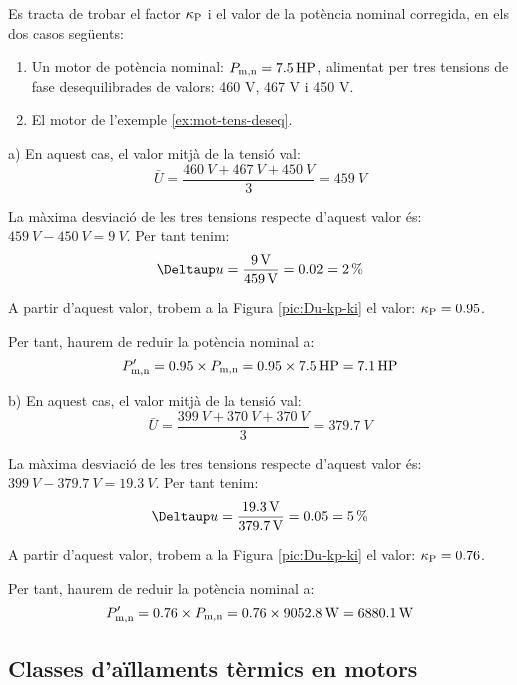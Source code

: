 \begin{exemple}\label{ex:NEMA-tens-deseq}
Es tracta de trobar el factor $\kappa_\mathrm{P}$  i el valor de la potència nominal corregida, en els dos casos següents:	
    \begin{enumerate}
		\renewcommand{\labelenumi}{\alph{enumi})}
		\item Un motor de  potència nominal: $P_\mathrm{m,n} = \SI{7,5}{HP}$, alimentat per tres tensions de fase desequilibrades   de valors: 460 V, 467 V i 450 V.
		
		\item El motor de l'exemple \vref{ex:mot-tens-deseq}.
	\end{enumerate}
	
	a)  En aquest cas, el valor mitjà de la tensió val:
    \[
      \bar{U} = \frac{\SI{460}{V}+\SI{467}{V}+\SI{450}{V}}{3} = \SI{459}{V}
    \]

    La màxima desviació de les tres tensions respecte d'aquest valor és: $\SI{459}{V}-\SI{450}{V} = \SI{9}{V}$. Per tant tenim:
    \[
        \Deltaup u = \frac{\SI{9}{V}}{\SI{459}{V}} = \num{0,02} = \SI{2}{\%}
    \]

     A partir d'aquest valor, trobem a la Figura \vref{pic:Du-kp-ki} el valor:  $\kappa_\mathrm{P} = \num{0,95}$.

     Per tant, haurem de reduir la potència nominal a:
     \[
         P'_\mathrm{m,n} = \num{0,95}\times{}P_\mathrm{m,n}  = \num{0,95}\times\SI{7,5}{HP} = \SI{7,1}{HP}
     \]
     
	 b)  En aquest cas, el valor mitjà de la tensió val:
	 \[
	 \bar{U} = \frac{\SI{399}{V}+\SI{370}{V}+\SI{370}{V}}{3} = \SI{379,7}{V}
	 \]
	 
	 La màxima desviació de les tres tensions respecte d'aquest valor és: $\SI{399}{V}-\SI{379,7}{V} = \SI{19,3}{V}$. Per tant tenim:
	 \[
	 \Deltaup u = \frac{\SI{19,3}{V}}{\SI{379,7}{V}} = \num{0,05} = \SI{5}{\%}
	 \]
	 
	 A partir d'aquest valor, trobem a la Figura \ref{pic:Du-kp-ki} el valor:  $\kappa_\mathrm{P} = \num{0,76}$.    
     
     Per tant, haurem de reduir la potència nominal a:
     \[
     P'_\mathrm{m,n} = \num{0,76}\times{}P_\mathrm{m,n}  = \num{0,76}\times\SI{9052,8}{W} = \SI{6880,1}{W}
     \]
\end{exemple}

\subsection{Classes d'aïllaments tèrmics en motors}

